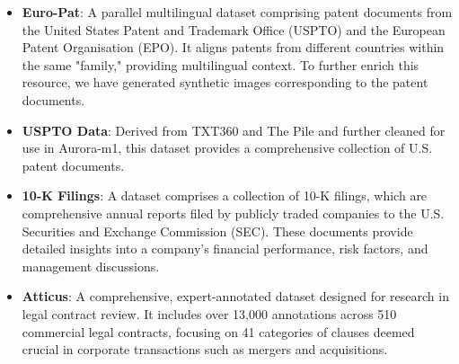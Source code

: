 \begin{itemize}
\item \textbf{Euro-Pat}: A parallel multilingual dataset comprising patent documents from the United States Patent and Trademark Office (USPTO) and the European Patent Organisation (EPO). It aligns patents from different countries within the same "family," providing multilingual context. To further enrich this resource, we have generated synthetic images corresponding to the patent documents.

\item \textbf{USPTO Data}: Derived from TXT360 and The Pile and further cleaned for use in Aurora-m1, this dataset provides a comprehensive collection of U.S. patent documents.




\item \textbf{10-K Filings}: A dataset comprises a collection of 10-K filings, which are comprehensive annual reports filed by publicly traded companies to the U.S. Securities and Exchange Commission (SEC). These documents provide detailed insights into a company's financial performance, risk factors, and management discussions.

\item \textbf{Atticus}: A comprehensive, expert-annotated dataset designed for research in legal contract review. It includes over 13,000 annotations across 510 commercial legal contracts, focusing on 41 categories of clauses deemed crucial in corporate transactions such as mergers and acquisitions.




\end{itemize}
